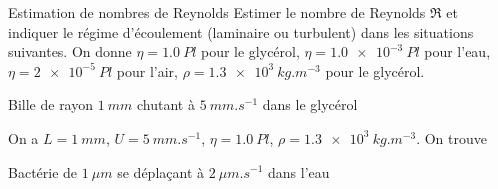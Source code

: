 \begin{exo}[PC][1][appli]{Estimation de nombres de Reynolds}
  \hauteurLargeurCadreReponse		{8mm}{7cm}
 Estimer le nombre de Reynolds $\Re$ et indiquer le régime d'écoulement (laminaire ou turbulent) dans les situations suivantes. On donne $\eta = \SI{1.0}{Pl}$ pour le glycérol, $\eta = \SI{1.0e-3}{Pl}$ pour l'eau, $\eta=\SI{2e-5}{Pl}$ pour l'air, $\rho = \SI{1.3e3}{kg.m^{-3}}$ pour le glycérol.


  \begin{enonce}
      Bille de rayon $\SI{1}{mm}$ chutant à $\SI{5}{mm.s^{-1}}$ dans le glycérol
  \end{enonce}
      
      
      \begin{corrige}
        On a $L = \SI{1}{mm}$, $U = \SI{5}{mm.s^{-1}}$, $\eta = \SI{1.0}{Pl}$, $\rho = \SI{1.3e3}{kg.m^{-3}}$. On trouve 
      \end{corrige}
      
  \begin{enonce}
  	Bactérie de $\SI{1}{\mu m}$ se déplaçant à $\SI{2}{\mu m.s^{-1}}$  dans l'eau
  \end{enonce}


\end{exo}
